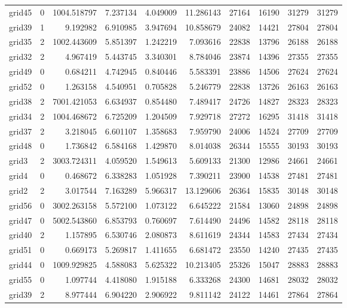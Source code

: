 \begin{longtable}{|l|r|r|r|r|r|r|r|r|r|}
grid45 & 0 & 1004.518797 & 7.237134 & 4.049009 & 11.286143 & 27164 & 16190 & 31279 & 31279 \\
grid39 & 1 & 9.192982 & 6.910985 & 3.947694 & 10.858679 & 24082 & 14421 & 27804 & 27804 \\
grid35 & 2 & 1002.443609 & 5.851397 & 1.242219 & 7.093616 & 22838 & 13796 & 26188 & 26188 \\
grid32 & 2 & 4.967419 & 5.443745 & 3.340301 & 8.784046 & 23874 & 14396 & 27355 & 27355 \\
grid49 & 0 & 0.684211 & 4.742945 & 0.840446 & 5.583391 & 23886 & 14506 & 27624 & 27624 \\
grid52 & 0 & 1.263158 & 4.540951 & 0.705828 & 5.246779 & 22838 & 13726 & 26163 & 26163 \\
grid38 & 2 & 7001.421053 & 6.634937 & 0.854480 & 7.489417 & 24726 & 14827 & 28323 & 28323 \\
grid34 & 2 & 1004.468672 & 6.725209 & 1.204509 & 7.929718 & 27272 & 16295 & 31418 & 31418 \\
grid37 & 2 & 3.218045 & 6.601107 & 1.358683 & 7.959790 & 24006 & 14524 & 27709 & 27709 \\
grid48 & 0 & 1.736842 & 6.584168 & 1.429870 & 8.014038 & 26344 & 15555 & 30193 & 30193 \\
grid3 & 2 & 3003.724311 & 4.059520 & 1.549613 & 5.609133 & 21300 & 12986 & 24661 & 24661 \\
grid4 & 0 & 0.468672 & 6.338283 & 1.051928 & 7.390211 & 23900 & 14538 & 27481 & 27481 \\
grid2 & 2 & 3.017544 & 7.163289 & 5.966317 & 13.129606 & 26364 & 15835 & 30148 & 30148 \\
grid56 & 0 & 3002.263158 & 5.572100 & 1.073122 & 6.645222 & 21584 & 13060 & 24898 & 24898 \\
grid47 & 0 & 5002.543860 & 6.853793 & 0.760697 & 7.614490 & 24496 & 14582 & 28118 & 28118 \\
grid40 & 2 & 1.157895 & 6.530746 & 2.080873 & 8.611619 & 24344 & 14583 & 27434 & 27434 \\
grid51 & 0 & 0.669173 & 5.269817 & 1.411655 & 6.681472 & 23550 & 14240 & 27435 & 27435 \\
grid44 & 0 & 1009.929825 & 4.588083 & 5.625322 & 10.213405 & 25326 & 15047 & 28883 & 28883 \\
grid55 & 0 & 1.097744 & 4.418080 & 1.915188 & 6.333268 & 24300 & 14681 & 28032 & 28032 \\
grid39 & 2 & 8.977444 & 6.904220 & 2.906922 & 9.811142 & 24122 & 14461 & 27864 & 27864 \\

\end{longtable}
